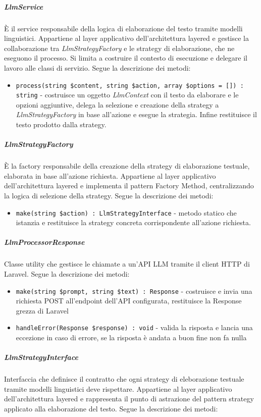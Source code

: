 \documentclass[a4paper,10pt]{article}
\begin{document}
\subparagraph{LlmService} È il service responsabile della logica di elaborazione del testo tramite modelli linguistici. Appartiene al layer applicativo dell'architettura layered e gestisce la collaborazione tra \textit{LlmStrategyFactory} e le strategy di elaborazione, che ne eseguono il processo. Si limita a costruire il contesto di esecuzione e delegare il lavoro alle classi di servizio. Segue la descrizione dei metodi:
\begin{itemize}
    \item \texttt{process(string \$content, string \$action, array \$options = []) : string} - costruisce un oggetto \textit{LlmContext} con il testo da elaborare e le opzioni aggiuntive, delega la selezione e creazione della strategy a \textit{LlmStrategyFactory} in base all'azione e esegue la strategia. Infine restituisce il testo prodotto dalla strategy.
\end{itemize}
\subparagraph{LlmStrategyFactory} È la factory responsabile della creazione della strategy di elaborazione testuale, elaborata in base all'azione richiesta. Appartiene al layer applicativo dell'architettura layered e implementa il pattern Factory Method, centralizzando la logica di selezione della strategy. Segue la descrizione dei metodi: 
\begin{itemize}
    \item \texttt{make(string \$action) : LlmStrategyInterface} - metodo statico che istanzia e restituisce la strategy concreta corrispondente all'azione richiesta.
\end{itemize}
\subparagraph{LlmProcessorResponse} Classe utility che gestisce le chiamate a un'API LLM tramite il client HTTP di Laravel. Segue la descrizione dei metodi: 
\begin{itemize}
    \item \texttt{make(string \$prompt, string \$text) : Response} - costruisce e invia una richiesta POST all'endpoint dell'API configurata, restituisce la Response grezza di Laravel
    \item \texttt{handleError(Response \$response) : void} - valida la risposta e lancia una eccezione in caso di errore, se la risposta è andata a buon fine non fa nulla
\end{itemize} 
\subparagraph{LlmStrategyInterface} Interfaccia che definisce il contratto che ogni strategy di eleborazione testuale tramite modelli linguistici deve rispettare. Appartiene al layer applicativo dell'architettura layered e rappresenta il punto di astrazione del pattern strategy applicato alla elaborazione del testo. Segue la descrizione dei metodi: 
\end{document}
